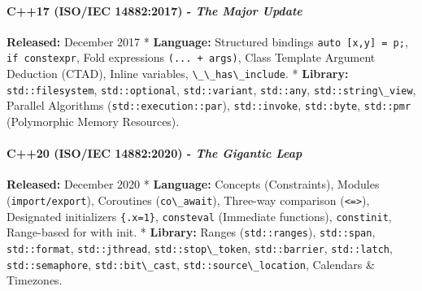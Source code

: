 \hypertarget{c17-isoiec-148822017---the-major-update}{%
\paragraph{\texorpdfstring{\textbf{C++17 (ISO/IEC 14882:2017)} -
\emph{The Major
Update}}{C++17 (ISO/IEC 14882:2017) - The Major Update}}\label{c17-isoiec-148822017---the-major-update}}

\textbf{Released:} December 2017 * \textbf{Language:} Structured
bindings \passthrough{\lstinline!auto [x,y] = p;!},
\passthrough{\lstinline!if constexpr!}, Fold expressions
\passthrough{\lstinline!(... + args)!}, Class Template Argument
Deduction (CTAD), Inline variables,
\passthrough{\lstinline!\_\_has\_include!}. * \textbf{Library:}
\passthrough{\lstinline!std::filesystem!},
\passthrough{\lstinline!std::optional!},
\passthrough{\lstinline!std::variant!},
\passthrough{\lstinline!std::any!},
\passthrough{\lstinline!std::string\_view!}, Parallel Algorithms
(\passthrough{\lstinline!std::execution::par!}),
\passthrough{\lstinline!std::invoke!},
\passthrough{\lstinline!std::byte!}, \passthrough{\lstinline!std::pmr!}
(Polymorphic Memory Resources).

\hypertarget{c20-isoiec-148822020---the-gigantic-leap}{%
\paragraph{\texorpdfstring{\textbf{C++20 (ISO/IEC 14882:2020)} -
\emph{The Gigantic
Leap}}{C++20 (ISO/IEC 14882:2020) - The Gigantic Leap}}\label{c20-isoiec-148822020---the-gigantic-leap}}

\textbf{Released:} December 2020 * \textbf{Language:} Concepts
(Constraints), Modules (\passthrough{\lstinline!import/export!}),
Coroutines (\passthrough{\lstinline!co\_await!}), Three-way comparison
(\passthrough{\lstinline!<=>!}), Designated initializers
\passthrough{\lstinline!\{.x=1\}!}, \passthrough{\lstinline!consteval!}
(Immediate functions), \passthrough{\lstinline!constinit!}, Range-based
for with init. * \textbf{Library:} Ranges
(\passthrough{\lstinline!std::ranges!}),
\passthrough{\lstinline!std::span!},
\passthrough{\lstinline!std::format!},
\passthrough{\lstinline!std::jthread!},
\passthrough{\lstinline!std::stop\_token!},
\passthrough{\lstinline!std::barrier!},
\passthrough{\lstinline!std::latch!},
\passthrough{\lstinline!std::semaphore!},
\passthrough{\lstinline!std::bit\_cast!},
\passthrough{\lstinline!std::source\_location!}, Calendars \& Timezones.

